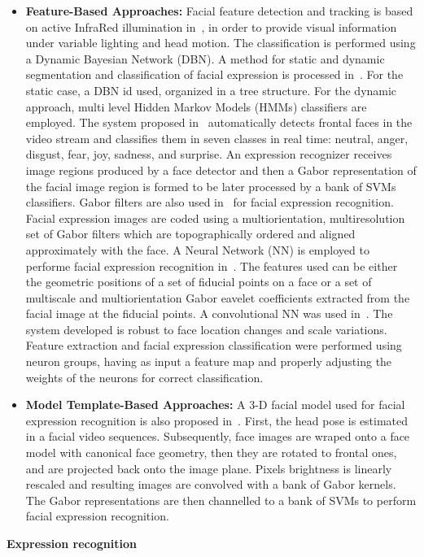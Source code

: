     \begin{itemize}
        \item \textbf{Feature-Based Approaches:} Facial feature detection and tracking is based on active InfraRed illumination in~\cite{Zhang2005Active}, in order to provide visual information under variable lighting and head motion. The classification is performed using a Dynamic Bayesian Network (DBN).
            A method for static and dynamic segmentation and classification of facial expression is processed in~\cite{Cohen2003Facial}. For the static case, a DBN id used, organized in a tree structure. For the dynamic approach, multi level Hidden Markov Models (HMMs) classifiers are employed.
            The system proposed in~\cite{Bartlett2003Real} automatically detects frontal faces in the video stream and classifies them in seven classes in real time: neutral, anger, disgust, fear, joy, sadness, and surprise. An expression recognizer receives image regions produced by a face detector and then a Gabor representation of the facial image region is formed to be later processed by a bank of SVMs classifiers.
            Gabor filters are also used in~\cite{Lyons1998Coding} for facial expression recognition. Facial expression images are coded using a multiorientation, multiresolution set of Gabor filters which are topographically ordered and aligned approximately with the face.
            A Neural Network (NN) is employed to performe facial expression recognition in~\cite{Zhang1998Comparison}. The features used can be either the geometric positions of a set of fiducial points on a face or a set of multiscale and multiorientation Gabor eavelet coefficients extracted from the facial image at the fiducial points.
            A convolutional NN was used in~\cite{Fasel2002Multiscale}. The system developed is robust to face location changes and scale variations. Feature extraction and facial expression classification were performed using neuron groups, having as input a feature map and properly adjusting the weights of the neurons for correct classification.

        \item \textbf{Model Template-Based Approaches:} A 3-D facial model used for facial expression recognition is also proposed in~\cite{Braathen2002An}. First, the head pose is estimated in a facial video sequences. Subsequently, face images are wraped onto a face model with canonical face geometry, then they are rotated to frontal ones, and are projected back onto the image plane. Pixels brightness is linearly rescaled and resulting images are convolved with a bank of Gabor kernels. The Gabor representations are then channelled to a bank of SVMs to perform facial expression recognition.
    \end{itemize}


    \noindent \textbf{Expression recognition}
